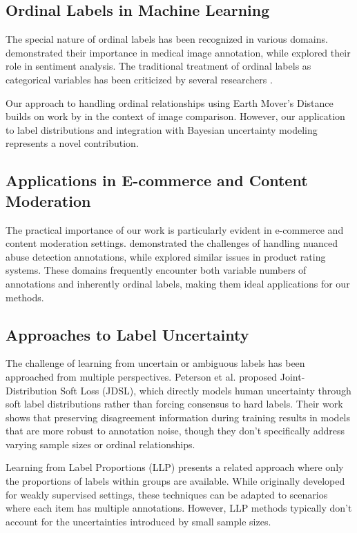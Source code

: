 \documentclass[journal]{IEEEtran}
\begin{document}
\subsection{Ordinal Labels in Machine Learning}
The special nature of ordinal labels has been recognized in various domains. \cite{cheplygina2018} demonstrated their importance in medical image annotation, while \cite{alm2011} explored their role in sentiment analysis. The traditional treatment of ordinal labels as categorical variables has been criticized by several researchers \cite{manning2011,zeman2010}.

Our approach to handling ordinal relationships using Earth Mover's Distance builds on work by \cite{levina2001} in the context of image comparison. However, our application to label distributions and integration with Bayesian uncertainty modeling represents a novel contribution.

\subsection{Applications in E-commerce and Content Moderation}
The practical importance of our work is particularly evident in e-commerce and content moderation settings. \cite{cercas2021} demonstrated the challenges of handling nuanced abuse detection annotations, while \cite{liu2016} explored similar issues in product rating systems. These domains frequently encounter both variable numbers of annotations and inherently ordinal labels, making them ideal applications for our methods.

\subsection{Approaches to Label Uncertainty}

The challenge of learning from uncertain or ambiguous labels has been approached from multiple perspectives. Peterson et al. \cite{peterson2019} proposed Joint-Distribution Soft Loss (JDSL), which directly models human uncertainty through soft label distributions rather than forcing consensus to hard labels. Their work shows that preserving disagreement information during training results in models that are more robust to annotation noise, though they don't specifically address varying sample sizes or ordinal relationships.

Learning from Label Proportions (LLP) \cite{quadrianto2009} presents a related approach where only the proportions of labels within groups are available. While originally developed for weakly supervised settings, these techniques can be adapted to scenarios where each item has multiple annotations. However, LLP methods typically don't account for the uncertainties introduced by small sample sizes.
\end{document}
